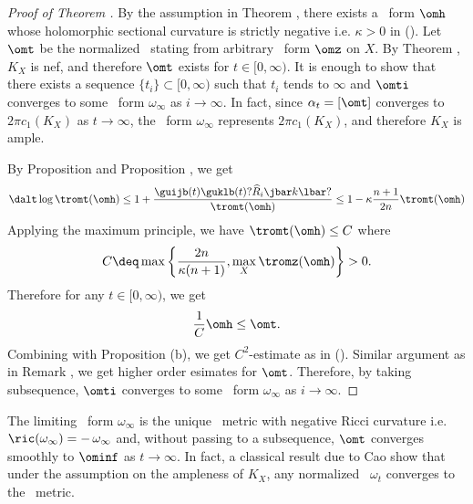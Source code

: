 \documentclass[12pt]{amsart}
\begin{document}
\begin{proof}[Proof of Theorem ]
By the assumption in Theorem , there exists  a \kahler \ form $\omh$ whose holomorphic sectional curvature is strictly negative i.e. $\kappa>0$ in (). Let $\omt $ be the normalized \krf \ stating from arbitrary \kahler \ form $\omz$ on $X$.
By Theorem , $K_X$ is nef, and therefore $\omt$ exists for $t \in [0,\infty)$.
It is enough to show that there exists a sequence $\{t_i \}\subset [0,\infty)$ such that $t_i $ tends to $\infty$ and $\omti$ converges to some \kahler \ form $\omega_\infty $ as $i \rightarrow \infty$. 
In fact, since $\alpha_t = [\omt ]$ converges to $2\pi c_1(K_X)$ as $t \rightarrow \infty$, the \kahler \ form $\omega_\infty$ represents $2\pi c_1(K_X)$, and
therefore $K_X$ is ample. 

By  Proposition  and Proposition , we get 
\begin{align*}
\dalt \log \tromt(\omh ) 
	\le 1+\dfrac{ \guijb (t) \guklb (t) ?{\widehat{R}}_i\jbar k \lbar ? }{ \tromt (\omh ) }
	\le 1-\kappa \dfrac{n+1}{2n}\tromt(\omh ) 
\end{align*}
Applying the maximum principle, we have $\tromt(\omh) \le C$ where
\begin{align*}
 C \deq \max \left\{\dfrac{2n}{\kappa (n+1)}, \max_X \tromz(\omh)  \right\}>0.
\end{align*}
Therefore for any $t \in [0,\infty )$, we get  
\begin{align}\label{C2ineq2}
	 \dfrac{1}{C}\omh \le \omt.
\end{align}
Combining with Proposition  (b), we get $C^2$-estimate as in (). Similar argument as in Remark , we get higher order esimates for $\omt$. Therefore, by taking subsequence, $\omti$ converges to some \kahler \ form $\omega_\infty $ as $i \rightarrow \infty$. 
\end{proof}

\begin{remark}
The limiting \kahler \ form $\omega_\infty$ is the unique \ke \ metric with negative Ricci curvature i.e. $\ric(\omega_\infty)= -\,  \omega_\infty$ and, without passing to a subsequence, $\omt$ converges smoothly to $\ominf$ as $t \rightarrow \infty$.
In fact, a classical result due to Cao \citep{Cao85Deformation} show that under the assumption on the ampleness of $K_X$, any normalized \krf \ $\omega_t$ converges to the \ke \ metric. 
\end{remark}

\nocite{*} 


\end{document}
